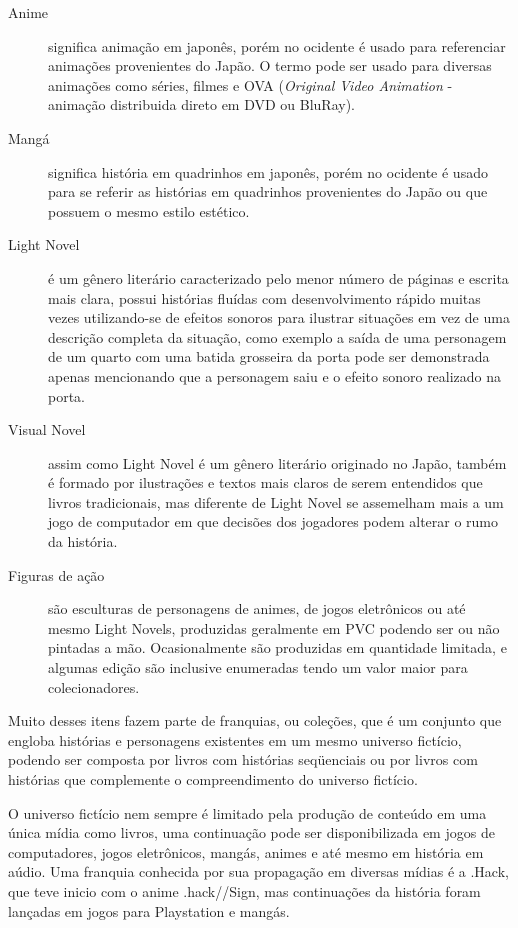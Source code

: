 \documentclass[12pt]{article}
\begin{document}
\begin{description}
\item[Anime] significa animação em japonês, porém no ocidente é usado para referenciar animações provenientes do Japão. O termo pode ser usado para diversas animações como séries, filmes e OVA (\textit{Original Video Animation} - animação distribuida direto em DVD ou BluRay).
\item[Mangá] significa história em quadrinhos em japonês, porém no ocidente é usado para se referir as histórias em quadrinhos provenientes do Japão ou que possuem o mesmo estilo estético.
\item[Light Novel] é um gênero literário caracterizado pelo menor número de páginas e escrita mais clara, possui histórias fluídas com desenvolvimento rápido muitas vezes utilizando-se de efeitos sonoros para ilustrar situações em vez de uma descrição completa da situação, como exemplo a saída de uma personagem de um quarto com uma batida grosseira da porta pode ser demonstrada apenas mencionando que a personagem saiu e o efeito sonoro realizado na porta.
\item[Visual Novel] assim como Light Novel é um gênero literário originado no Japão, também é formado por ilustrações e textos mais claros de serem entendidos que livros tradicionais, mas diferente de Light Novel se assemelham mais a um jogo de computador em que decisões dos jogadores podem alterar o rumo da história.
\item[Figuras de ação] são esculturas de personagens de animes, de jogos eletrônicos ou até mesmo Light Novels, produzidas geralmente em PVC podendo ser ou não pintadas a mão. Ocasionalmente são produzidas em quantidade limitada, e algumas edição são inclusive enumeradas tendo um valor maior para colecionadores.
\end{description}


Muito desses itens fazem parte de franquias, ou coleções, que é um conjunto que engloba histórias e personagens existentes em um mesmo universo fictício, podendo ser composta por livros com histórias seqüenciais ou por livros com histórias que complemente o compreendimento do universo fictício. 

O universo fictício nem sempre é limitado pela produção de conteúdo em uma única mídia como livros, uma continuação pode ser disponibilizada em jogos de computadores, jogos eletrônicos, mangás, animes e até mesmo em história em aúdio. Uma franquia conhecida por sua propagação em diversas mídias é a .Hack, que teve inicio com o anime .hack//Sign, mas continuações da história foram lançadas em jogos para Playstation e mangás. 
\end{document}
